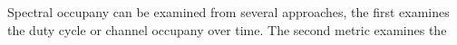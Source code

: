 

Spectral occupany can be examined from several approaches, the first examines the duty cycle or channel occupany over time.  The second metric examines the 


